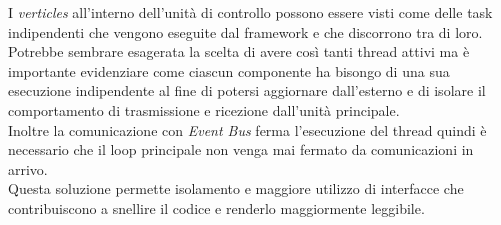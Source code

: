 \documentclass{report}
\begin{document}
\par{
I \textit{verticles} all'interno dell'unità di controllo possono essere visti come delle task indipendenti che vengono eseguite dal framework e che discorrono tra di loro. \\
Potrebbe sembrare esagerata la scelta di avere così tanti thread attivi ma è importante evidenziare come ciascun componente ha bisongo di una sua esecuzione indipendente al fine di potersi aggiornare dall'esterno e di isolare il comportamento di trasmissione e ricezione dall'unità principale.\\ Inoltre la comunicazione con \textit{Event Bus} ferma l'esecuzione del thread quindi è necessario che il loop principale non venga mai fermato da comunicazioni in arrivo. \\
Questa soluzione permette isolamento e maggiore utilizzo di interfacce che contribuiscono a snellire il codice e renderlo maggiormente leggibile.\\
}
\end{document}

